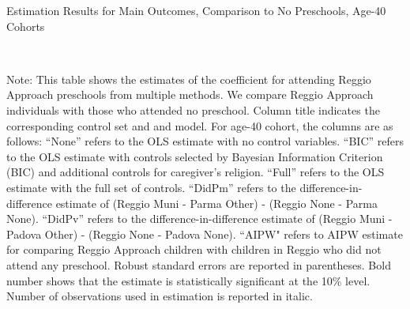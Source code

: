 \begin{table}[H] \caption{Estimation Results for Main Outcomes, Comparison to No Preschools, Age-40 Cohorts} \label{ols-M-adult40-reg-nopres}
\scalebox{0.65}{}
\vspace{1ex} \\
\footnotesize\raggedright{Note: This table shows the estimates of the coefficient for attending Reggio Approach preschools from multiple methods. We compare Reggio Approach individuals with those who attended no preschool. Column title indicates the corresponding control set and and model. For age-40 cohort, the columns are as follows: ``None'' refers to the OLS estimate with no control variables. ``BIC'' refers to the OLS estimate with controls selected by Bayesian Information Criterion (BIC) and additional controls for caregiver's religion. ``Full'' refers to the OLS estimate with the full set of controls. ``DidPm'' refers to the difference-in-difference estimate of (Reggio Muni - Parma Other) - (Reggio None - Parma None). ``DidPv'' refers to the difference-in-difference estimate of (Reggio Muni - Padova Other) - (Reggio None - Padova None).  ``AIPW" refers to AIPW estimate for comparing Reggio Approach children with children in Reggio who did not attend any preschool. Robust standard errors are reported in parentheses. Bold number shows that the estimate is statistically significant at the 10\% level. Number of observations used in estimation is reported in italic.}
\end{table}

